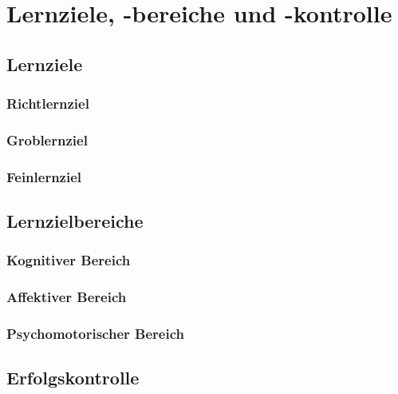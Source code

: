 \chapter{Lernziele, -bereiche und -kontrolle}

\section{Lernziele}

\subsection{Richtlernziel}

\subsection{Groblernziel}

\subsection{Feinlernziel}

\section{Lernzielbereiche}

\subsection{Kognitiver Bereich}

\subsection{Affektiver Bereich}

\subsection{Psychomotorischer Bereich}

\section{Erfolgskontrolle}



